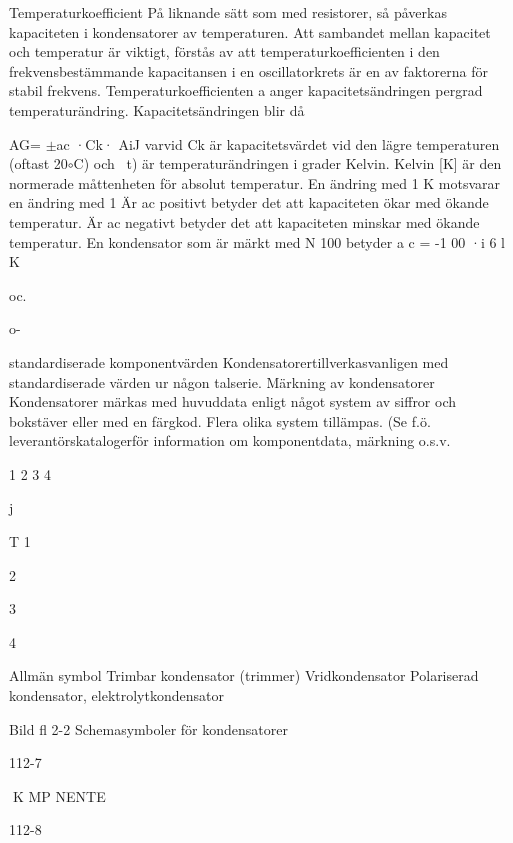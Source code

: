 Temperaturkoefficient
På liknande sätt som med resistorer, så
påverkas kapaciteten i kondensatorer av
temperaturen. Att sambandet mellan kapacitet och temperatur är viktigt, förstås av att
temperaturkoefficienten i den frekvensbestämmande kapacitansen i en oscillatorkrets
är en av faktorerna för stabil frekvens.
Temperaturkoefficienten a anger kapacitetsändringen pergrad temperaturändring.
Kapacitetsändringen blir då

AG= $\pm$ac ·Ck· AiJ
varvid Ck är kapacitetsvärdet vid den lägre
temperaturen (oftast 20$\circ$C) och ~t) är
temperaturändringen i grader Kelvin.
Kelvin [K] är den normerade måttenheten
för absolut temperatur.
En ändring med 1 K motsvarar en ändring med 1
Är ac positivt betyder det att kapaciteten
ökar med ökande temperatur.
Är ac negativt betyder det att kapaciteten
minskar med ökande temperatur.
En kondensator som är märkt med N 100
betyder a c = -1 00 ·i 6 l K

oc.

o-

standardiserade komponentvärden
Kondensatorertillverkasvanligen med standardiserade värden ur någon talserie.
Märkning av kondensatorer
Kondensatorer märkas med huvuddata enligt något system av siffror och bokstäver
eller med en färgkod. Flera olika system
tillämpas.
(Se f.ö. leverantörskatalogerför information
om komponentdata, märkning o.s.v.

1
2
3
4

j

T
1

2

3

4

Allmän symbol
Trimbar kondensator (trimmer)
Vridkondensator
Polariserad kondensator,
elektrolytkondensator

Bild fl 2-2 Schemasymboler för kondensatorer

112-7

K MP NENTE

112-8

